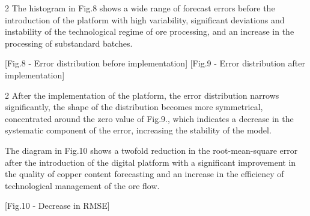 \begin{multicols}{2}
The histogram in Fig.8 shows a wide range of forecast errors before the
introduction of the platform with high variability, significant
deviations and instability of the technological regime of ore
processing, and an increase in the processing of substandard batches.
\end{multicols}

[Fig.8 - Error distribution before implementation]
[Fig.9 - Error distribution after implementation]

\begin{multicols}{2}
After the implementation of the platform, the error distribution narrows
significantly, the shape of the distribution becomes more symmetrical,
concentrated around the zero value of Fig.9., which indicates a decrease
in the systematic component of the error, increasing the stability of
the model.

The diagram in Fig.10 shows a twofold reduction in the root-mean-square
error after the introduction of the digital platform with a significant
improvement in the quality of copper content forecasting and an increase
in the efficiency of technological management of the ore flow.
\end{multicols}

[Fig.10 - Decrease in RMSE]

